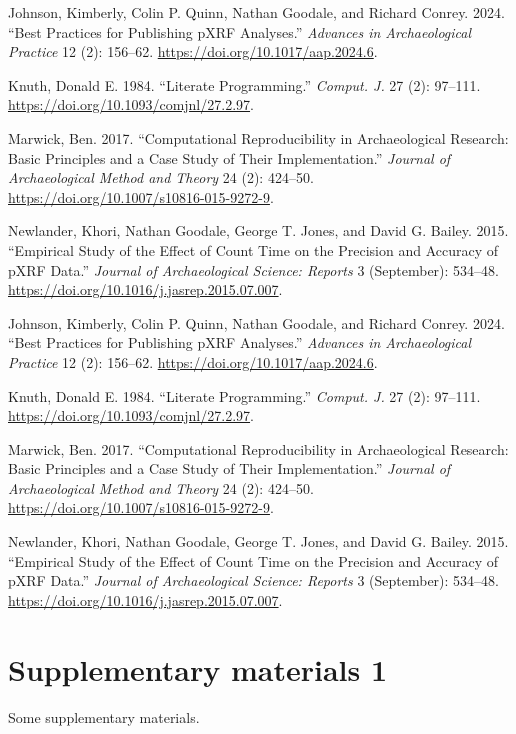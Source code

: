 \documentclass[
  a4paper,
  DIV=11,
  numbers=noendperiod]{scrreprt}
\newlength{\cslhangindent}
\newenvironment{CSLReferences}[2] %
 {\begin{list}{}{%
  \setlength{\itemindent}{0pt}
  \setlength{\leftmargin}{0pt}
  \setlength{\parsep}{0pt}
  \ifodd #1
   \setlength{\leftmargin}{\cslhangindent}
   \setlength{\itemindent}{-1\cslhangindent}
  \fi
  \setlength{\itemsep}{#2\baselineskip}}}
 {\end{list}}
\begin{document}
\label{refs}
\begin{CSLReferences}{1}{0}
Johnson, Kimberly, Colin P. Quinn, Nathan Goodale, and Richard Conrey.
2024. {``Best Practices for Publishing pXRF Analyses.''} \emph{Advances
in Archaeological Practice} 12 (2): 156--62.
\url{https://doi.org/10.1017/aap.2024.6}.

Knuth, Donald E. 1984. {``Literate Programming.''} \emph{Comput. J.} 27
(2): 97--111. \url{https://doi.org/10.1093/comjnl/27.2.97}.

Marwick, Ben. 2017. {``Computational Reproducibility in Archaeological
Research: Basic Principles and a Case Study of Their Implementation.''}
\emph{Journal of Archaeological Method and Theory} 24 (2): 424--50.
\url{https://doi.org/10.1007/s10816-015-9272-9}.

Newlander, Khori, Nathan Goodale, George T. Jones, and David G. Bailey.
2015. {``Empirical Study of the Effect of Count Time on the Precision
and Accuracy of pXRF Data.''} \emph{Journal of Archaeological Science:
Reports} 3 (September): 534--48.
\url{https://doi.org/10.1016/j.jasrep.2015.07.007}.

\end{CSLReferences}

\label{refs}
\begin{CSLReferences}{1}{0}
Johnson, Kimberly, Colin P. Quinn, Nathan Goodale, and Richard Conrey.
2024. {``Best Practices for Publishing pXRF Analyses.''} \emph{Advances
in Archaeological Practice} 12 (2): 156--62.
\url{https://doi.org/10.1017/aap.2024.6}.

Knuth, Donald E. 1984. {``Literate Programming.''} \emph{Comput. J.} 27
(2): 97--111. \url{https://doi.org/10.1093/comjnl/27.2.97}.

Marwick, Ben. 2017. {``Computational Reproducibility in Archaeological
Research: Basic Principles and a Case Study of Their Implementation.''}
\emph{Journal of Archaeological Method and Theory} 24 (2): 424--50.
\url{https://doi.org/10.1007/s10816-015-9272-9}.

Newlander, Khori, Nathan Goodale, George T. Jones, and David G. Bailey.
2015. {``Empirical Study of the Effect of Count Time on the Precision
and Accuracy of pXRF Data.''} \emph{Journal of Archaeological Science:
Reports} 3 (September): 534--48.
\url{https://doi.org/10.1016/j.jasrep.2015.07.007}.

\end{CSLReferences}

\cleardoublepage
{}
{}
\appendix

\chapter{Supplementary materials 1}\label{supplementary-materials-1}

Some supplementary materials.
\end{document}
